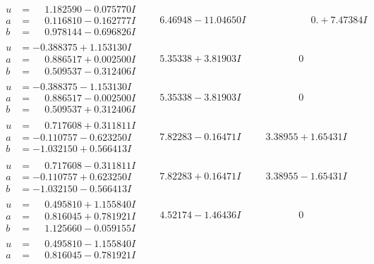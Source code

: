 \documentclass[1p]{elsarticle_modified}
\theoremstyle{definition}
\begin{document}
$$\begin{array}{c|c|c}
\begin{aligned}
u &= \phantom{-}1.182590 - 0.075770 I \\
a &= \phantom{-}0.116810 - 0.162777 I \\
b &= \phantom{-}0.978144 - 0.696826 I\end{aligned}
 & \phantom{-}6.46948 - 11.04650 I & \phantom{-0.000000 -}0. + 7.47384 I \\ \hline\begin{aligned}
u &= -0.388375 + 1.153130 I \\
a &= \phantom{-}0.886517 + 0.002500 I \\
b &= \phantom{-}0.509537 - 0.312406 I\end{aligned}
 & \phantom{-}5.35338 + 3.81903 I & \phantom{-0.000000 } 0 \\ \hline\begin{aligned}
u &= -0.388375 - 1.153130 I \\
a &= \phantom{-}0.886517 - 0.002500 I \\
b &= \phantom{-}0.509537 + 0.312406 I\end{aligned}
 & \phantom{-}5.35338 - 3.81903 I & \phantom{-0.000000 } 0 \\ \hline\begin{aligned}
u &= \phantom{-}0.717608 + 0.311811 I \\
a &= -0.110757 - 0.623250 I \\
b &= -1.032150 + 0.566413 I\end{aligned}
 & \phantom{-}7.82283 - 0.16471 I & \phantom{-}3.38955 + 1.65431 I \\ \hline\begin{aligned}
u &= \phantom{-}0.717608 - 0.311811 I \\
a &= -0.110757 + 0.623250 I \\
b &= -1.032150 - 0.566413 I\end{aligned}
 & \phantom{-}7.82283 + 0.16471 I & \phantom{-}3.38955 - 1.65431 I \\ \hline\begin{aligned}
u &= \phantom{-}0.495810 + 1.155840 I \\
a &= \phantom{-}0.816045 + 0.781921 I \\
b &= \phantom{-}1.125660 - 0.059155 I\end{aligned}
 & \phantom{-}4.52174 - 1.46436 I & \phantom{-0.000000 } 0 \\ \hline\begin{aligned}
u &= \phantom{-}0.495810 - 1.155840 I \\
a &= \phantom{-}0.816045 - 0.781921 I \\

\end{aligned}
\end{array}$$
\end{document}
